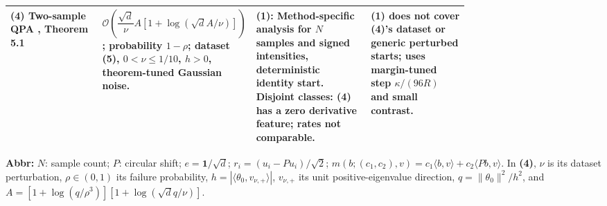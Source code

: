 \begin{table}[tp]
\begin{threeparttable}
\begin{tabularx}{\linewidth}{@{}>{\raggedright\arraybackslash}p{0.20\linewidth}>{\raggedright\arraybackslash}p{0.32\linewidth}>{\raggedright\arraybackslash}p{0.25\linewidth}>{\raggedright\arraybackslash}X@{}}
\midrule
\textbf{(4)} Two-sample QPA \citep{tsTyurinV2}, Theorem 5.1 & $\mathcal{O}\!\left(\dfrac{\sqrt d}{\nu}A[1+\log(\sqrt d A/\nu)]\right)$; probability $1-\rho$; dataset (5), $0<\nu\le1/10$, $h>0$, theorem-tuned Gaussian noise. & \textbf{(1)}: Method-specific analysis for $N$ samples and signed intensities, deterministic identity start. Disjoint classes: \textbf{(4)} has a zero derivative feature; rates not comparable. & \textbf{(1)} does not cover \textbf{(4)}'s dataset or generic perturbed starts; uses margin-tuned step $\kappa/(96R)$ and small contrast. \\
\bottomrule
\end{tabularx}
\begin{tablenotes}[flushleft]\footnotesize
\item[] \textbf{Abbr:} $N$: sample count; $P$: circular shift; $e=\mathbf1/\sqrt d$; $r_i=(u_i-Pu_i)/\sqrt2$; $m(b;(c_1,c_2),v)=c_1\langle b,v\rangle+c_2\langle Pb,v\rangle$. In \textbf{(4)}, $\nu$ is its dataset perturbation, $\rho\in(0,1)$ its failure probability, $h=|\langle\theta_0,v_{\nu,+}\rangle|$, $v_{\nu,+}$ its unit positive-eigenvalue direction, $q=\|\theta_0\|^2/h^2$, and $A=[1+\log(q/\rho^3)][1+\log(\sqrt d q/\nu)]$.
\end{tablenotes}
\end{threeparttable}
\end{table}
\clearpage
